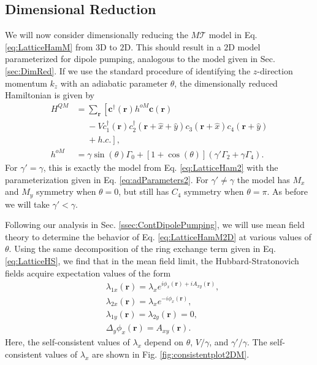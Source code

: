 \documentclass[prb,aps,twocolumn,groupaddress,floatfix]{revtex4-1}
\begin{document}
\subsection{Dimensional Reduction}
We will now consider dimensionally reducing the $M\mathcal{T}$ model in Eq. \ref{eq:LatticeHamM} from $3$D to $2$D. This should result in a $2$D model parameterized for dipole pumping, analogous to the model given in Sec. \ref{sec:DimRed}. If we use the standard procedure of identifying the $z$-direction momentum $k_z$ with an adiabatic parameter $\theta$, the dimensionally reduced Hamiltonian is given by
\begin{equation}
\begin{split}
H^{QM} &= \sum_{\bm{r}}\left[ \bm{c}^\dagger(\bm{r}) h^{oM} \bm{c}(\bm{r}) \right.\\&\phantom{=} - V c_1^\dagger(\bm{r})c^\dagger_2(\bm{r}+\hat{x}+\hat{y})c_3(\bm{r}+\hat{x})c_4(\bm{r}+\hat{y}) \\&\phantom{=}+\left. h.c.\right],\\
h^{oM} &= \gamma \sin(\theta) \Gamma_0 + [1+\cos(\theta)](\gamma' \Gamma_2+\gamma \Gamma_4).
\end{split}\label{eq:LatticeHamM2D}
\end{equation}
For $\gamma' = \gamma$, this is exactly the model from Eq. \ref{eq:LatticeHam2} with the parameterization given in Eq. \ref{eq:adParameters2}. For $\gamma' \neq \gamma$ the model has $M_x$ and $M_y$ symmetry when $\theta = 0$, but still has $C_4$ symmetry when $\theta = \pi$. As before we will take $\gamma' < \gamma$.

Following our analysis in Sec. \ref{ssec:ContDipolePumping}, we will use mean field theory to determine the behavior of Eq. \ref{eq:LatticeHamM2D} at various values of $\theta$. Using the same decomposition of the ring exchange term given in Eq. \ref{eq:LatticeHS}, we find that in the mean field limit, the Hubbard-Stratonovich fields acquire expectation values of the form
\begin{equation}
\begin{split}
&\lambda_{1x}(\bm{r}) = \lambda_x e^{i\phi_x(\bm{r}) + i A_{xy}(\bm{r})},\\
&\lambda_{2x}(\bm{r})  = \lambda_xe^{-i \phi_x(\bm{r})} ,\\
&\lambda_{1y}(\bm{r}) = \lambda_{2y}(\bm{r}) = 0,\\
 &\Delta_y \phi_x(\bm{r}) = A_{xy}(\bm{r}).
\end{split}\label{eq:selfconsistentM2D}
\end{equation}
Here, the self-consistent values of $\lambda_x$ depend on $\theta$, $V/\gamma$, and $\gamma'/\gamma$. The self-consistent values of $\lambda_x$ are shown in Fig. \ref{fig:consistentplot2DM}. 
\end{document}
